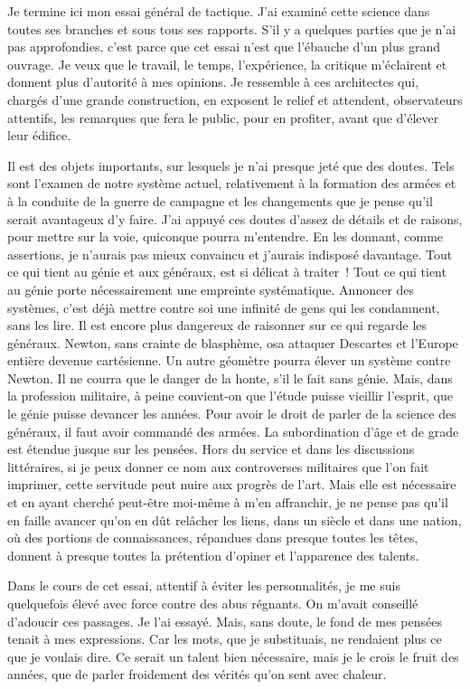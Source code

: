 \documentclass[french,twoside]{book} %
\begin{document}
\noindent Je termine ici mon essai général de tactique. J’ai examiné cette science dans toutes ses branches et sous tous ses rapports. S’il y a quelques parties que je n’ai pas approfondies, c’est parce que cet essai n’est que l’ébauche d’un plus grand ouvrage. Je veux que le travail, le temps, l’expérience, la critique m’éclairent et donnent plus d’autorité à mes opinions. Je ressemble à ces architectes qui, chargés d’une grande construction, en exposent le relief et attendent, observateurs attentifs, les remarques que fera le public, pour en profiter, avant que d’élever leur édifice.\par
Il est des objets importants, sur lesquels je n’ai presque jeté que des doutes. Tels sont l’examen de notre système actuel, relativement à la formation des armées et à la conduite de la guerre de campagne et les changements que je pense qu’il serait avantageux d’y faire. J’ai appuyé ces doutes d’assez de détails et de raisons, pour mettre sur la voie, quiconque pourra m’entendre. En les donnant, comme assertions, je n’aurais pas mieux convaincu et j’aurais indisposé davantage. Tout ce qui tient au génie et aux généraux, est si délicat à traiter ! Tout ce qui tient au génie porte nécessairement une empreinte systématique. Annoncer des systèmes, c’est déjà mettre contre soi une infinité de gens qui les condamnent, sans les lire. Il est encore plus dangereux de raisonner sur ce qui regarde les généraux. Newton, sans crainte de blasphème, osa attaquer Descartes et l’Europe entière devenue cartésienne. Un autre géomètre pourra élever un système contre Newton. Il ne courra que le danger de la honte, s’il le fait sans génie. Mais, dans la profession militaire, à peine convient-on que l’étude puisse vieillir l’esprit, que le génie puisse devancer les années. Pour avoir le droit de parler de la science des généraux, il faut avoir commandé des armées. La subordination d’âge et de grade est étendue jusque sur les pensées. Hors du service et dans les discussions littéraires, si je peux donner ce nom aux controverses militaires que l’on fait imprimer, cette servitude peut nuire aux progrès de l’art. Mais elle est nécessaire et en ayant cherché peut-être moi-même à m’en affranchir, je ne pense pas qu’il en faille avancer qu’on en dût relâcher les liens, dans un siècle et dans une nation, où des portions de connaissances, répandues dans presque toutes les têtes, donnent à presque toutes la prétention d’opiner et l’apparence des talents.\par
Dans le cours de cet essai, attentif à éviter les personnalités, je me suis quelquefois élevé avec force contre des abus régnants. On m’avait conseillé d’adoucir ces passages. Je l’ai essayé. Mais, sans doute, le fond de mes pensées tenait à mes expressions. Car les mots, que je substituais, ne rendaient plus ce que je voulais dire. Ce serait un talent bien nécessaire, mais je le crois le fruit des années, que de parler froidement des vérités qu’on sent avec chaleur.\par
\end{document}
